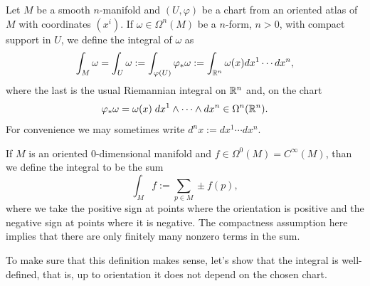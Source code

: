 \begin{definition}\label{def:intnform:chart}
  Let $M$ be a smooth $n$-manifold and $(U,\varphi)$ be a chart from an oriented atlas of $M$ with coordinates $(x^i)$.
  If $\omega\in\Omega^n(M)$ be a $n$-form, $n > 0$, with compact support in $U$, we define the integral of $\omega$ as
  \begin{equation}
    \int_M \omega = \int_U \omega := \int_{\varphi(U)} \varphi_*\omega := \int_{\mathbb{R}^n} \omega(x) d x^1\cdots dx^n,
  \end{equation}
  where the last is the usual Riemannian integral on $\mathbb{R}^n$ and, on the chart
  \begin{equation}
    \varphi_*\omega = \omega(x)\; dx^{1}\wedge \cdots\wedge dx^{n}\in\Omega^n(\mathbb{R}^n).
  \end{equation}
  For convenience we may sometimes write $d^n x := dx^1 \cdots dx^n$.

  If $M$ is an oriented $0$-dimensional manifold and $f\in\Omega^0(M) = C^\infty(M)$, than we define the integral to be the sum
  \begin{equation}
    \int_M f := \sum_{p\in M} \pm f(p),
  \end{equation}
  where we take the positive sign at points where the orientation is positive and the negative sign at points where it is negative.
  The compactness assumption here implies that there are only finitely many nonzero terms in the sum.
\end{definition}

To make sure that this definition makes sense, let's show that the integral is well-defined, that is, up to orientation it does not depend on the chosen chart.

